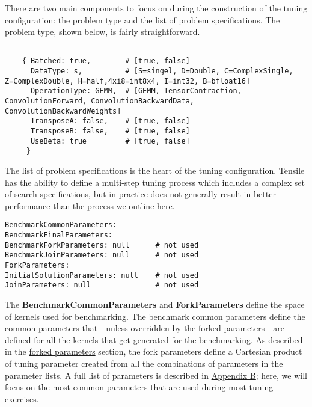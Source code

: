 \documentclass[]{article}
\begin{document}
There are two main components to focus on during the construction of the tuning configuration: the problem type and the list of problem specifications. The problem type, shown below, is fairly straightforward.

\begin{verbatim}

- - { Batched: true,        # [true, false]
      DataType: s,          # [S=singel, D=Double, C=ComplexSingle, Z=ComplexDouble, H=half,4xi8=int8x4, I=int32, B=bfloat16]
      OperationType: GEMM,  # [GEMM, TensorContraction, ConvolutionForward, ConvolutionBackwardData, ConvolutionBackwardWeights]
      TransposeA: false,    # [true, false]
      TransposeB: false,    # [true, false]
      UseBeta: true         # [true, false]
     }         

\end{verbatim}

The list of problem specifications is the heart of the tuning configuration. Tensile has the ability to define a multi-step tuning process which includes a complex set of search specifications, but in practice does not generally result in better performance than the process we outline here.
\begin{verbatim}
BenchmarkCommonParameters:
BenchmarkFinalParameters: 
BenchmarkForkParameters: null      # not used
BenchmarkJoinParameters: null      # not used
ForkParameters:
InitialSolutionParameters: null    # not used
JoinParameters: null               # not used
\end{verbatim}

The  {\color{ForestGreen} \bf BenchmarkCommonParameters} and  {\color{ForestGreen} \bf ForkParameters} define the space of kernels used for benchmarking. The benchmark common parameters define the common parameters that---unless overridden by the forked parameters---are defined for all the kernels that get generated for the benchmarking. As described in the \hyperref[sec:forkParams]{forked parameters} section, the fork parameters define a Cartesian product of tuning parameter created from all the combinations of parameters in the parameter lists. A full list of parameters is described in \hyperref[sec:appendixB]{Appendix B}; here, we will focus on the most common parameters that are used during most tuning exercises.
\end{document}

